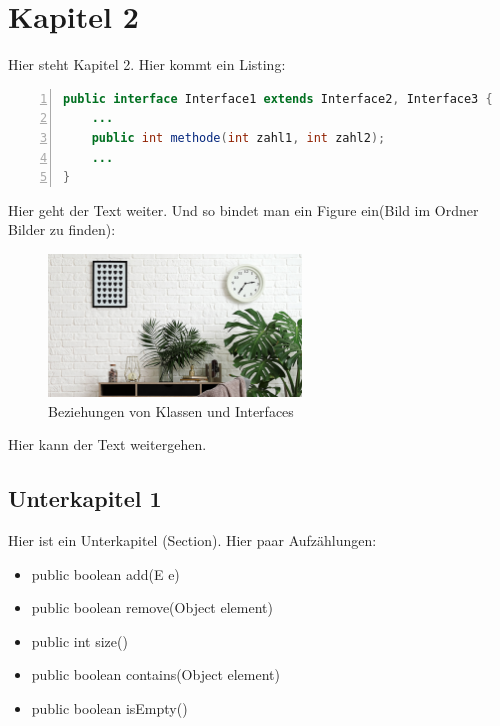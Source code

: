 \documentclass[fontsize=12pt,paper=a4,open=any,parskip=half,
  twoside=false,toc=listof,toc=bibliography,fleqn,leqno,
  captions=nooneline,captions=tableabove,british]{scrbook}
\begin{document}
\chapter{Kapitel 2}\label{ch:interfaces}
Hier steht Kapitel 2. Hier kommt ein Listing:
\begin{lstlisting}[language=Java,
					caption={Deklaration eines Interfaces},
					backgroundcolor = \color{lightgray},
					captionpos=b,
					numbers=left,
					keywordstyle=\color{RoyalBlue},
    				rulecolor=\color{black},
   		 			upquote=true, 
					showstringspaces=false,
    				breaklines=true,
    				frame=single,
					aboveskip=2em,
					label={interface-deklaration},
]
public interface Interface1 extends Interface2, Interface3 {
	...
	public int methode(int zahl1, int zahl2);
	...
}
\end{lstlisting}
\captionsetup{justification=centering,margin=2cm}

Hier geht der Text weiter. Und so bindet man ein Figure ein(Bild im Ordner Bilder zu finden):


\begin{figure}[htbp]
 \centering
 \includegraphics[width=0.6\textwidth]{Bilder/bildname}
 \captionsetup{justification=centering,margin=2cm}
 \caption{Beziehungen von Klassen und Interfaces \autocite{jtpinterface}}
 \label{interface-relation}
\end{figure}

Hier kann der Text weitergehen.


\section{Unterkapitel 1}\label{sec:c.f}
Hier ist ein Unterkapitel (Section). Hier paar Aufzählungen:

\begin{itemize}
 \item public boolean add(E e) 
 \item public boolean remove(Object element)
 \item public int size()
 \item public boolean contains(Object element)
 \item public boolean isEmpty()
\end{itemize}
\end{document}
